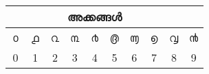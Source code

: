 \documentclass[a4paper]{article}
\makeatletter
\def\en{\color{black!80}\normalsize\En}
\def\at{\expandafter\@gobble\string\@}
\makeatother
\begin{document}
\begin{tabular}{|c|c|c|c|c|c|c|c|c|c|}

\multicolumn{9}{c}{അക്കങ്ങൾ}\\
\hline
൦ & ൧ & ൨ & ൩ & ൪ & ൫  & ൬  & ൭  & ൮ & ൯  \\
\en \at0 & \en \at1 & \en \at2 & \en \at3 & \en \at4 & \en \at5 & \en \at6 & \en \at7 & \en \at8 & \en \at9 \\
\hline
\end{tabular}
\end{document}
